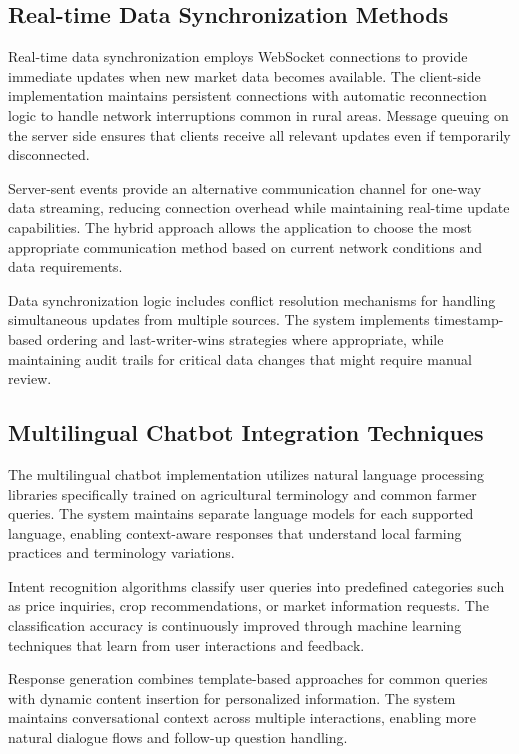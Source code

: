 \subsection{Real-time Data Synchronization Methods}

Real-time data synchronization employs WebSocket connections to provide immediate updates when new market data becomes available. The client-side implementation maintains persistent connections with automatic reconnection logic to handle network interruptions common in rural areas. Message queuing on the server side ensures that clients receive all relevant updates even if temporarily disconnected.

Server-sent events provide an alternative communication channel for one-way data streaming, reducing connection overhead while maintaining real-time update capabilities. The hybrid approach allows the application to choose the most appropriate communication method based on current network conditions and data requirements.

Data synchronization logic includes conflict resolution mechanisms for handling simultaneous updates from multiple sources. The system implements timestamp-based ordering and last-writer-wins strategies where appropriate, while maintaining audit trails for critical data changes that might require manual review.

\subsection{Multilingual Chatbot Integration Techniques}

The multilingual chatbot implementation utilizes natural language processing libraries specifically trained on agricultural terminology and common farmer queries. The system maintains separate language models for each supported language, enabling context-aware responses that understand local farming practices and terminology variations.

Intent recognition algorithms classify user queries into predefined categories such as price inquiries, crop recommendations, or market information requests. The classification accuracy is continuously improved through machine learning techniques that learn from user interactions and feedback.

Response generation combines template-based approaches for common queries with dynamic content insertion for personalized information. The system maintains conversational context across multiple interactions, enabling more natural dialogue flows and follow-up question handling.

